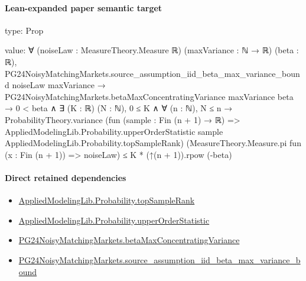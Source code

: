 \documentclass[10pt]{article}
\begin{document}
\paragraph{Lean-expanded paper semantic target}
\begin{ReviewVerbatim}
type:
Prop

value:
∀ (noiseLaw : MeasureTheory.Measure ℝ) (maxVariance : ℕ → ℝ) (beta : ℝ),
  PG24NoisyMatchingMarkets.source_assumption_iid_beta_max_variance_bound noiseLaw maxVariance →
    PG24NoisyMatchingMarkets.betaMaxConcentratingVariance maxVariance beta →
      0 < beta ∧
        ∃ (K : ℝ) (N : ℕ),
          0 ≤ K ∧
            ∀ (n : ℕ),
              N ≤ n →
                ProbabilityTheory.variance
                    (fun (sample : Fin (n + 1) → ℝ) =>
                      AppliedModelingLib.Probability.upperOrderStatistic sample
                        AppliedModelingLib.Probability.topSampleRank)
                    (MeasureTheory.Measure.pi fun (x : Fin (n + 1)) => noiseLaw) ≤
                  K * (↑(n + 1)).rpow (-beta)
\end{ReviewVerbatim}

\paragraph{Direct retained dependencies}
\begin{itemize}\raggedright
\item \hyperlink{governing-declaration-d58648457b8a1e1a}{Applied\allowbreak{}Modeling\allowbreak{}Lib.\allowbreak{}Probability.\allowbreak{}top\allowbreak{}Sample\allowbreak{}Rank}
\item \hyperlink{governing-declaration-cdeff774dc07136a}{Applied\allowbreak{}Modeling\allowbreak{}Lib.\allowbreak{}Probability.\allowbreak{}upper\allowbreak{}Order\allowbreak{}Statistic}
\item \hyperlink{governing-declaration-322e8322d17fd70c}{PG24\allowbreak{}Noisy\allowbreak{}Matching\allowbreak{}Markets.\allowbreak{}beta\allowbreak{}Max\allowbreak{}Concentrating\allowbreak{}Variance}
\item \hyperlink{governing-declaration-106a735d10bd3342}{PG24\allowbreak{}Noisy\allowbreak{}Matching\allowbreak{}Markets.\allowbreak{}source\_\allowbreak{}assumption\_\allowbreak{}iid\_\allowbreak{}beta\_\allowbreak{}max\_\allowbreak{}variance\_\allowbreak{}bound}
\end{itemize}
\end{document}
